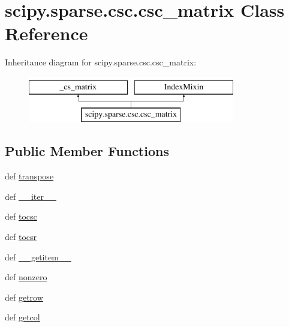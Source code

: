 \hypertarget{classscipy_1_1sparse_1_1csc_1_1csc__matrix}{}\section{scipy.\+sparse.\+csc.\+csc\+\_\+matrix Class Reference}
\label{classscipy_1_1sparse_1_1csc_1_1csc__matrix}
Inheritance diagram for scipy.\+sparse.\+csc.\+csc\+\_\+matrix\+:\begin{figure}[H]
\begin{center}
\leavevmode
\includegraphics[height=2.000000cm]{classscipy_1_1sparse_1_1csc_1_1csc__matrix}
\end{center}
\end{figure}
\subsection*{Public Member Functions}
\begin{DoxyCompactItemize}
\item 
def \hyperlink{classscipy_1_1sparse_1_1csc_1_1csc__matrix_ad397cd26c41600f60fd4660e719fb746}{transpose}
\item 
def \hyperlink{classscipy_1_1sparse_1_1csc_1_1csc__matrix_a90b7d8af4745730ee208f141fe7760c0}{\+\_\+\+\_\+iter\+\_\+\+\_\+}
\item 
def \hyperlink{classscipy_1_1sparse_1_1csc_1_1csc__matrix_afb41398b35e7b61cff6dddaa075845a0}{tocsc}
\item 
def \hyperlink{classscipy_1_1sparse_1_1csc_1_1csc__matrix_aa5b4f4973c068de5e142baee102d4135}{tocsr}
\item 
def \hyperlink{classscipy_1_1sparse_1_1csc_1_1csc__matrix_a72e02bb6c12358075d6ae6fa69a2ad6d}{\+\_\+\+\_\+getitem\+\_\+\+\_\+}
\item 
def \hyperlink{classscipy_1_1sparse_1_1csc_1_1csc__matrix_aa4d6714d5d3aa1cabb445f551d25138e}{nonzero}
\item 
def \hyperlink{classscipy_1_1sparse_1_1csc_1_1csc__matrix_adafb0fd09cb9064f095802f8ce812fd4}{getrow}
\item 
def \hyperlink{classscipy_1_1sparse_1_1csc_1_1csc__matrix_a715b3622544c36ae1bd94b1f55a7774e}{getcol}
\end{DoxyCompactItemize}


